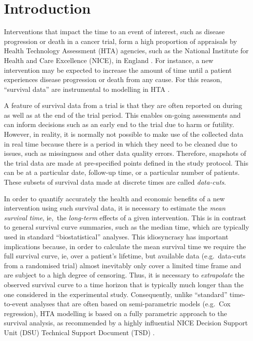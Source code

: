 \documentclass[AMA,STIX1COL]{WileyNJD-v2}
\begin{document}

\maketitle


\section{Introduction}\label{sec:intro}
Interventions that impact the time to an event of interest, such as disease progression or death in a cancer trial, form a high proportion of appraisals by Health Technology Assessment (HTA) agencies, such as the National Institute for Health and Care Excellence (NICE), in England \citep{Latimer2011}.
For instance, a new intervention may be expected to increase the amount of time until a patient experiences disease progression or death from any cause. For this reason, ``survival data'' are instrumental to modelling in HTA \cite{Demiris2006, Jackson2010}.

A feature of survival data from a trial is that they are often reported on during as well as at the end of the trial period.
This enables on-going assessments and can inform decisions such as an early end to the trial due to harm or futility.
However, in reality, it is normally not possible to make use of the collected data in real time because there is a period in which they need to be cleaned due to issues, such as missingness and other data quality errors.
Therefore, snapshots of the trial data are made at pre-specified points defined in the study protocol.
This can be at a particular date, follow-up time, or a particular number of patients.
These subsets of survival data made at discrete times are called \textit{data-cuts}.

In order to quantify accurately the health and economic benefits of a new intervention using such survival data, it is necessary to estimate the {\it mean survival time}, ie,~the \textit{long-term} effects of a given intervention.
This is in contrast to general survival curve summaries, such as the median time, which are typically used in standard ``biostatistical'' analyses.
This idiosyncrasy has important implications because, in order to calculate the mean survival time we require the full survival curve, ie, over a patient's lifetime, but available data (e.g.~data-cuts from a randomised trial) almost inevitably only cover a limited time frame and are subject to a high degree of censoring.
Thus, it is necessary to \textit{extrapolate} the observed survival curve to a time horizon that is typically much longer than the one considered in the experimental study.
Consequently, unlike ``standard'' time-to-event analyses that are often based on semi-parametric models (e.g.~Cox regression), HTA modelling is based on a fully parametric approach to the survival analysis, as recommended by a highly influential NICE Decision Support Unit (DSU) Technical Support Document (TSD) \citep{Latimer2011}.
\end{document}
